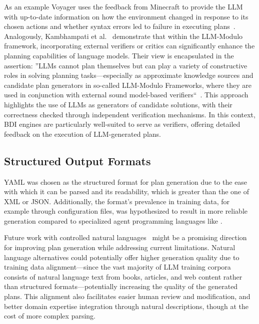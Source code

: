 \documentclass[12pt,a4paper,openright,twoside]{book}
\begin{document}
As an example Voyager uses the feedback from Minecraft to provide the \ac{LLM} with up-to-date information on how the environment changed in response to its chosen actions and whether syntax errors led to failure in executing plans~\cite{WangX0MXZFA24}.
%
Analogously, Kambhampati et al.~\cite{kambhampatiLLMsCantPlan2024} demonstrate that within the LLM-Modulo framework, incorporating external verifiers or critics can significantly enhance the planning capabilities of language models.
%
Their view is encapsulated in the assertion: ''\acp{LLM} cannot plan themselves but can play a variety of constructive roles in solving planning tasks---especially as approximate knowledge sources and candidate plan generators in so-called LLM-Modulo Frameworks, where they are used in conjunction with external sound model-based verifiers``~\cite{kambhampatiLLMsCantPlan2024}.
%
This approach highlights the use of \acp{LLM} as generators of candidate solutions, with their correctness checked through independent verification mechanisms.
%
In this context, BDI engines are particularly well-suited to serve as verifiers, offering detailed feedback on the execution of \ac{LLM}-generated plans.

\subsection{Structured Output Formats}\label{sec:llm-gen-formats}

YAML was chosen as the structured format for plan generation due to the ease with which it can be parsed and its readability, which is greater than the one of XML or JSON.
%
Additionally, the format's prevalence in training data, for example through configuration files, was hypothesized to result in more reliable generation compared to specialized agent programming languages like \agentspeak{}. 

Future work with controlled natural languages~\cite{kuhnSurveyClassificationControlled2014} might be a promising direction for improving plan generation while addressing current limitations. 
%
Natural language alternatives could potentially offer higher generation quality due to training data alignment---since the vast majority of LLM training corpora consists of natural language text from books, articles, and web content rather than structured formats---potentially increasing the quality of the generated plans.
%
This alignment also facilitates easier human review and modification, and better domain expertise integration through natural descriptions, though at the cost of more complex parsing. 
\end{document}
